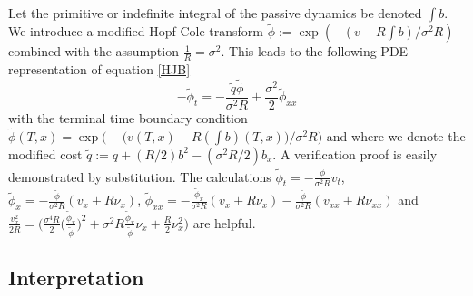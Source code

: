 \documentclass[letterpaper, 12pt]{article}
\newcommand{\tilphi}{\tilde{\phi}}
\begin{document}
\indent Let the primitive or indefinite integral of the passive dynamics be denoted $\int b$. We introduce a modified Hopf Cole transform $\tilde{\phi} := \exp(-(v - R\int b)/\sigma^2 R)$ combined with the assumption $\frac{1}{R} = \sigma^2$. This leads to the following PDE representation of equation \eqref{HJB}
\begin{equation}
-\tilde{\phi}_t = -\frac{\tilde{q} \tilde{\phi}}{\sigma^2 R} + \frac{\sigma^2}{2} \tilde{\phi}_{xx} \label{modHopfColeHJB}
\end{equation}
with the terminal time boundary condition $\tilde{\phi}(T,x) = \exp\bigg(-\bigg(v(T,x) - R (\int b)(T,x)\bigg)/\sigma^2 R\bigg)$ and where we denote the modified cost $\tilde{q} := q + (R/2)b^2 - (\sigma^2R/2) b_x$.  A verification proof is easily demonstrated by substitution. The calculations $\tilphi_t = -\frac{\tilphi}{\sigma^2 R} v_t$, $\tilphi_x = -\frac{\tilphi}{\sigma^2 R} (v_x + R \nu_x)$, $\tilphi_{xx} = -\frac{\tilphi_x}{\sigma^2 R} (v_x + R \nu_x) - \frac{\tilphi}{\sigma^2 R} (v_{xx} + R\nu_{xx})$ and $\frac{v_x^2}{2R} = \bigg( \frac{\sigma^4 R}{2}\bigg( \frac{\tilphi_x}{\tilphi} \bigg)^2 + \sigma^2 R \frac{\tilphi_x}{\tilphi} \nu_x + \frac{R}{2}\nu_x^2 \bigg)$ are helpful.

\subsection{Interpretation} \label{sec:interpretHopfCole}
\end{document}
